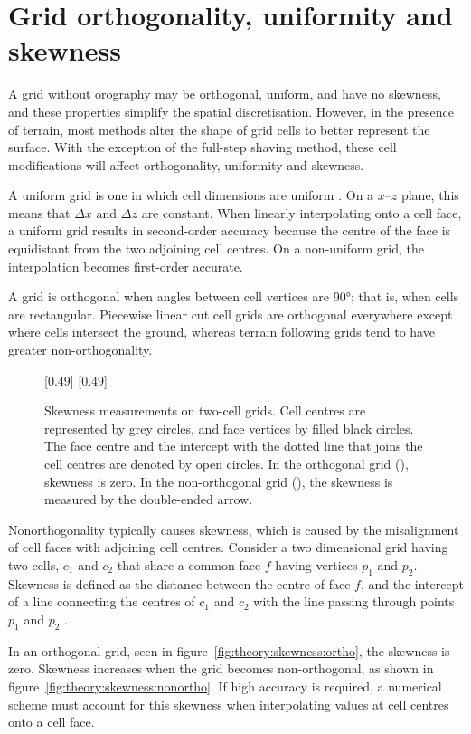 \section{Grid orthogonality, uniformity and skewness}
\label{sec:theory:skewness}

A grid without orography may be orthogonal, uniform, and have no skewness, and these properties simplify the spatial discretisation.  However, in the presence of terrain, most methods alter the shape of grid cells to better represent the surface.  With the exception of the full-step shaving method, these cell modifications will affect orthogonality, uniformity and skewness.

A uniform grid is one in which cell dimensions are uniform \autocite{leveque2002}.  On a $x$--$z$ plane, this means that $\Delta x$ and $\Delta z$ are constant.  When linearly interpolating onto a cell face, a uniform grid results in second-order accuracy because the centre of the face is equidistant from the two adjoining cell centres.  On a non-uniform grid, the interpolation becomes first-order accurate.

A grid is orthogonal when angles between cell vertices are \ang{90}; that is, when cells are rectangular.  Piecewise linear cut cell grids are orthogonal everywhere except where cells intersect the ground, whereas terrain following grids tend to have greater non-orthogonality.

\begin{figure}
	\captionsetup[subfigure]{position=b}
	\centering
	[0.49\textwidth]{\vspace{1em}}
	\hfill
	[0.49\textwidth]{}
%
	\caption{Skewness measurements on two-cell grids.  Cell centres are represented by grey circles, and face vertices by filled black circles.  The face centre and the intercept with the dotted line that joins the cell centres are denoted by open circles.  In the orthogonal grid (), skewness is zero.  In the non-orthogonal grid (), the skewness is measured by the double-ended arrow.}
	\label{fig:theory:skewness}
\end{figure}

Nonorthogonality typically causes skewness, which is caused by the misalignment of cell faces with adjoining cell centres.
Consider a two dimensional grid having two cells, $c_1$ and $c_2$ that share a common face $f$ having vertices $p_1$ and $p_2$.  Skewness is defined as the distance between the centre of face $f$, and the intercept of a line connecting the centres of $c_1$ and $c_2$ with the line passing through points $p_1$ and $p_2$ \autocite{moraes2013}.

In an orthogonal grid, seen in figure~\ref{fig:theory:skewness:ortho}, the skewness is zero.  Skewness increases when the grid becomes non-orthogonal, as shown in figure~\ref{fig:theory:skewness:nonortho}.  If high accuracy is required, a numerical scheme must account for this skewness when interpolating values at cell centres onto a cell face.
